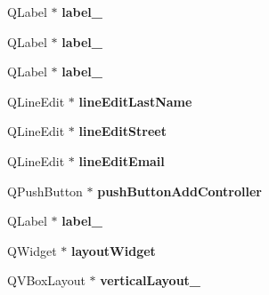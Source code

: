 \begin{DoxyCompactItemize}
\item 
\hypertarget{classUi__MainWindow_a13936e6f18b1c90402b3c7a3c92b6cdb}{Q\-Label $\ast$ {\bfseries label\-\_}}\label{classUi__MainWindow_a13936e6f18b1c90402b3c7a3c92b6cdb}

\item 
\hypertarget{classUi__MainWindow_a2e2516d755e4dd53fc905dabddf2738a}{Q\-Label $\ast$ {\bfseries label\-\_}}\label{classUi__MainWindow_a2e2516d755e4dd53fc905dabddf2738a}

\item 
\hypertarget{classUi__MainWindow_a0376fd90247280e7c7957cc70628708c}{Q\-Label $\ast$ {\bfseries label\-\_}}\label{classUi__MainWindow_a0376fd90247280e7c7957cc70628708c}

\item 
\hypertarget{classUi__MainWindow_a14afae957779e9c63ed1edc8c516b716}{Q\-Line\-Edit $\ast$ {\bfseries line\-Edit\-Last\-Name}}\label{classUi__MainWindow_a14afae957779e9c63ed1edc8c516b716}

\item 
\hypertarget{classUi__MainWindow_a8e797f3b830cc018723634efd54ed176}{Q\-Line\-Edit $\ast$ {\bfseries line\-Edit\-Street}}\label{classUi__MainWindow_a8e797f3b830cc018723634efd54ed176}

\item 
\hypertarget{classUi__MainWindow_a4d8087a407ec83b6cec220589823c5da}{Q\-Line\-Edit $\ast$ {\bfseries line\-Edit\-Email}}\label{classUi__MainWindow_a4d8087a407ec83b6cec220589823c5da}

\item 
\hypertarget{classUi__MainWindow_aa4c7382730d45f387f74937db539a157}{Q\-Push\-Button $\ast$ {\bfseries push\-Button\-Add\-Controller}}\label{classUi__MainWindow_aa4c7382730d45f387f74937db539a157}

\item 
\hypertarget{classUi__MainWindow_af183bfbfb9f38bbdd60caf92b15e23dc}{Q\-Label $\ast$ {\bfseries label\-\_}}\label{classUi__MainWindow_af183bfbfb9f38bbdd60caf92b15e23dc}

\item 
\hypertarget{classUi__MainWindow_ab96ab0f0578098521fa69a75aa5cdde8}{Q\-Widget $\ast$ {\bfseries layout\-Widget}}\label{classUi__MainWindow_ab96ab0f0578098521fa69a75aa5cdde8}

\item 
\hypertarget{classUi__MainWindow_a38b8a4b887f3b58e2a49e7905ae6f1f0}{Q\-V\-Box\-Layout $\ast$ {\bfseries vertical\-Layout\-\_}}\label{classUi__MainWindow_a38b8a4b887f3b58e2a49e7905ae6f1f0}


\end{DoxyCompactItemize}
